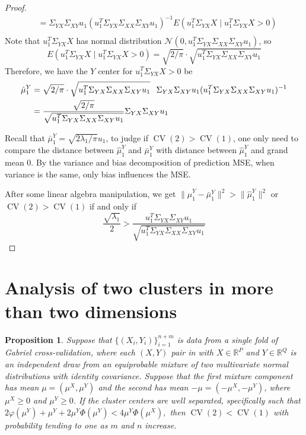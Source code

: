 \documentclass[12pt]{article}
\newtheorem{proposition}{Proposition}
\newcommand{\CV}{\operatorname{CV}}
\newcommand{\muX}{\mu^{X}}
\newcommand{\muY}{\mu^{Y}}
\begin{document}
\begin{proof}
\begin{align}
 		      & =  \Sigma_{YX}\Sigma_{XY}u_1 (u^T_1\Sigma_{YX} \Sigma_{XX} \Sigma_{XY} u_1)^{-1} E(u^T_1\Sigma_{YX}X \mid u^T_1\Sigma_{YX}X>0) \\ \nonumber
\end{align}
Note that $u^T_1\Sigma_{YX}X$ has normal distribution $\mathcal{N} \left( 0, u^T_1\Sigma_{YX} \Sigma_{XX} \Sigma_{XY} u_1\right)$, so
\[
E(u^T_1\Sigma_{YX}X \mid u^T_1\Sigma_{YX}X>0) = \sqrt{2/\pi}\cdot\sqrt{u^T_1\Sigma_{YX} \Sigma_{XX} \Sigma_{XY} u_1}
\]
Therefore, we have the $Y$ center for $u^T_1\Sigma_{YX}X>0$ be
\begin{align*}
\hat{\mu}^Y_1 &= \sqrt{2/\pi}\cdot\sqrt{u^T_1\Sigma_{YX} \Sigma_{XX} \Sigma_{XY} u_1} \hspace{0.1in} \Sigma_{YX}\Sigma_{XY}u_1 (u^T_1\Sigma_{YX} \Sigma_{XX} \Sigma_{XY} u_1)^{-1} \\
&=\frac{\sqrt{2/\pi}}{\sqrt{u^T_1\Sigma_{YX} \Sigma_{XX} \Sigma_{XY} u_1}} \Sigma_{YX}\Sigma_{XY}u_1
\end{align*} 
 
Recall that $\bar{\mu}^Y_1 =\sqrt{2 \lambda_1/\pi}u_1$, to judge if $\CV(2) >
\CV(1)$, one only need to compare the distance between  $\hat{\mu}^Y_1$  and
$\bar{\mu}^Y_1$ with distance between  $\hat{\mu}^Y_1$ and grand mean $0$. By
the variance and bias decomposition of prediction MSE, when variance is the
same, only bias influences the MSE. 

After some linear algebra manipulation, we get
$\|\hat{\mu}^Y_1 - \bar{\mu}^Y_1\|^2 > \|\hat{\mu}^Y_1\|^2$ or $\CV(2) >
\CV(1)$ if and only if
\[
 \frac{\sqrt{\lambda_1}}{2} > \frac{u^T_1\Sigma_{YX}\Sigma_{XY}u_1}{\sqrt{u^T_1\Sigma_{YX} \Sigma_{XX} \Sigma_{XY} u_1}} 
\]
\end{proof}


\section{Analysis of two clusters in more than two dimensions}
\label{app:twoclust-anyd}


\begin{proposition}\label{prop:twoclust-anyd}
Suppose that $\{(X_i,Y_i)\}_{i=1}^{n+m}$ is data from a single fold of Gabriel
    cross-validation, where each $(X,Y)$ pair in with $X \in \mathbb{R}^P$ and $Y \in
    \mathbb{R}^Q$ is an independent draw
from an equiprobable mixture of two multivariate normal distributions with
identity covariance. Suppose that the first mixture component has mean
$\mu = (\muX, \muY)$ and the second has mean $-\mu = (-\muX, -\muY)$,
where $\muX \geq 0$ and $\muY \geq 0$. 
If the cluster centers are well separated, specifically such that
\(
  2 \varphi(\muY) + \muY + 2 \muY \Phi(\muY) < 4 \muY \Phi(\muX),
\)
then $\CV(2) < \CV(1)$ with probability tending to one as $m$ and $n$ increase.
\end{proposition}
\end{document}
